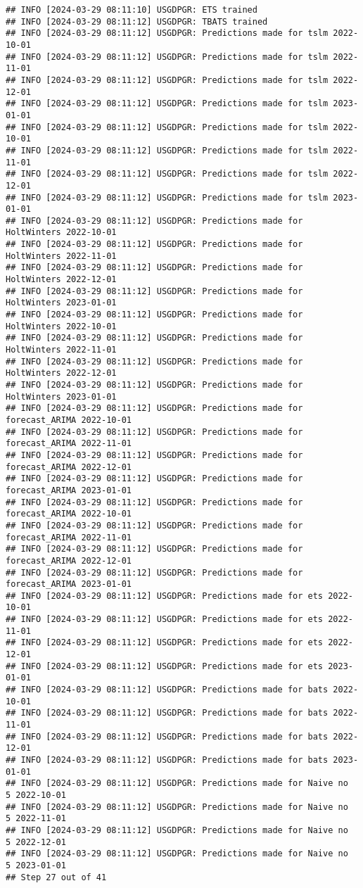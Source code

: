 \documentclass[
]{article}
\begin{document}
\begin{verbatim}
## INFO [2024-03-29 08:11:10] USGDPGR: ETS trained
## INFO [2024-03-29 08:11:12] USGDPGR: TBATS trained
## INFO [2024-03-29 08:11:12] USGDPGR: Predictions made for tslm 2022-10-01
## INFO [2024-03-29 08:11:12] USGDPGR: Predictions made for tslm 2022-11-01
## INFO [2024-03-29 08:11:12] USGDPGR: Predictions made for tslm 2022-12-01
## INFO [2024-03-29 08:11:12] USGDPGR: Predictions made for tslm 2023-01-01
## INFO [2024-03-29 08:11:12] USGDPGR: Predictions made for tslm 2022-10-01
## INFO [2024-03-29 08:11:12] USGDPGR: Predictions made for tslm 2022-11-01
## INFO [2024-03-29 08:11:12] USGDPGR: Predictions made for tslm 2022-12-01
## INFO [2024-03-29 08:11:12] USGDPGR: Predictions made for tslm 2023-01-01
## INFO [2024-03-29 08:11:12] USGDPGR: Predictions made for HoltWinters 2022-10-01
## INFO [2024-03-29 08:11:12] USGDPGR: Predictions made for HoltWinters 2022-11-01
## INFO [2024-03-29 08:11:12] USGDPGR: Predictions made for HoltWinters 2022-12-01
## INFO [2024-03-29 08:11:12] USGDPGR: Predictions made for HoltWinters 2023-01-01
## INFO [2024-03-29 08:11:12] USGDPGR: Predictions made for HoltWinters 2022-10-01
## INFO [2024-03-29 08:11:12] USGDPGR: Predictions made for HoltWinters 2022-11-01
## INFO [2024-03-29 08:11:12] USGDPGR: Predictions made for HoltWinters 2022-12-01
## INFO [2024-03-29 08:11:12] USGDPGR: Predictions made for HoltWinters 2023-01-01
## INFO [2024-03-29 08:11:12] USGDPGR: Predictions made for forecast_ARIMA 2022-10-01
## INFO [2024-03-29 08:11:12] USGDPGR: Predictions made for forecast_ARIMA 2022-11-01
## INFO [2024-03-29 08:11:12] USGDPGR: Predictions made for forecast_ARIMA 2022-12-01
## INFO [2024-03-29 08:11:12] USGDPGR: Predictions made for forecast_ARIMA 2023-01-01
## INFO [2024-03-29 08:11:12] USGDPGR: Predictions made for forecast_ARIMA 2022-10-01
## INFO [2024-03-29 08:11:12] USGDPGR: Predictions made for forecast_ARIMA 2022-11-01
## INFO [2024-03-29 08:11:12] USGDPGR: Predictions made for forecast_ARIMA 2022-12-01
## INFO [2024-03-29 08:11:12] USGDPGR: Predictions made for forecast_ARIMA 2023-01-01
## INFO [2024-03-29 08:11:12] USGDPGR: Predictions made for ets 2022-10-01
## INFO [2024-03-29 08:11:12] USGDPGR: Predictions made for ets 2022-11-01
## INFO [2024-03-29 08:11:12] USGDPGR: Predictions made for ets 2022-12-01
## INFO [2024-03-29 08:11:12] USGDPGR: Predictions made for ets 2023-01-01
## INFO [2024-03-29 08:11:12] USGDPGR: Predictions made for bats 2022-10-01
## INFO [2024-03-29 08:11:12] USGDPGR: Predictions made for bats 2022-11-01
## INFO [2024-03-29 08:11:12] USGDPGR: Predictions made for bats 2022-12-01
## INFO [2024-03-29 08:11:12] USGDPGR: Predictions made for bats 2023-01-01
## INFO [2024-03-29 08:11:12] USGDPGR: Predictions made for Naive no  5 2022-10-01
## INFO [2024-03-29 08:11:12] USGDPGR: Predictions made for Naive no  5 2022-11-01
## INFO [2024-03-29 08:11:12] USGDPGR: Predictions made for Naive no  5 2022-12-01
## INFO [2024-03-29 08:11:12] USGDPGR: Predictions made for Naive no  5 2023-01-01
## Step 27 out of 41
\end{verbatim}
\end{document}
